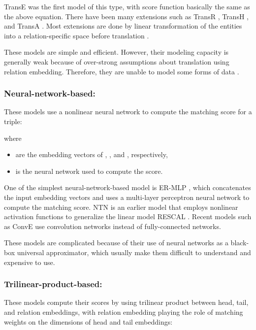 \documentclass[sigconf,edbt]{acmart-edbt2019}
\begin{document}
TransE \cite{bordes_translatingembeddingsmodeling_2013} was the first model of this type, with score function basically the same as the above equation. There have been many extensions such as TransR \cite{lin_learningentityrelation_2015}, TransH \cite{wang_knowledgegraphembedding_2014}, and TransA \cite{xiao_transaadaptiveapproach_2015}. Most extensions are done by linear transformation of the entities into a relation-specific space before translation \cite{lin_learningentityrelation_2015}.

These models are simple and efficient. However, their modeling capacity is generally weak because of over-strong assumptions about translation using relation embedding. Therefore, they are unable to model some forms of data \cite{wang_multirelationallinkprediction_2018}.

\subsubsection{Neural-network-based:} These models use a nonlinear neural network to compute the matching score for a triple:

where 
\begin{itemize}
	\item  are the embedding vectors of , , and , respectively,
	\item  is the neural network used to compute the score.
\end{itemize}

One of the simplest neural-network-based model is ER-MLP \cite{dong_knowledgevaultwebscale_2014}, which concatenates the input embedding vectors and uses a multi-layer perceptron neural network to compute the matching score.
NTN \cite{socher_reasoningneuraltensor_2013} is an earlier model that employs nonlinear activation functions to generalize the linear model RESCAL \cite{nickel_threewaymodelcollective_2011}. Recent models such as ConvE \cite{dettmers_convolutional2dknowledge_2018} use convolution networks instead of fully-connected networks.

These models are complicated because of their use of neural networks as a black-box universal approximator, which usually make them difficult to understand and expensive to use.

\subsubsection{Trilinear-product-based:} These models compute their scores by using trilinear product between head, tail, and relation embeddings, with relation embedding playing the role of matching weights on the dimensions of head and tail embeddings:
\end{document}
